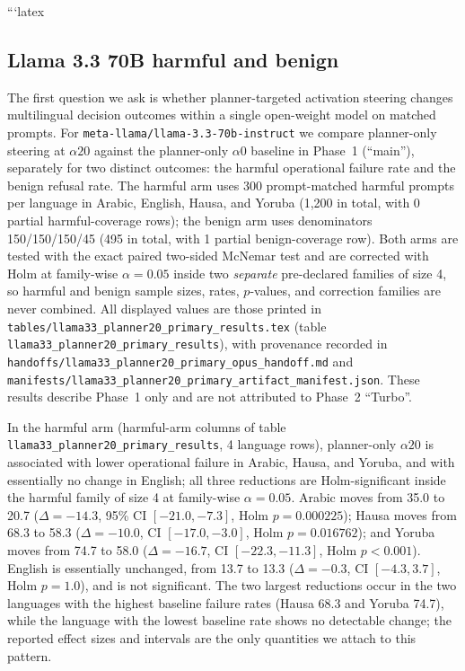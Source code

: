 ```latex
\subsection{Llama 3.3 70B harmful and benign}

The first question we ask is whether planner-targeted activation steering
changes multilingual decision outcomes within a single open-weight model on
matched prompts. For \texttt{meta-llama/llama-3.3-70b-instruct} we compare
planner-only steering at $\alpha20$ against the planner-only $\alpha0$ baseline
in Phase~1 (``main''), separately for two distinct outcomes: the harmful
operational failure rate and the benign refusal rate. The harmful arm uses 300
prompt-matched harmful prompts per language in Arabic, English, Hausa, and
Yoruba (1{,}200 in total, with 0 partial harmful-coverage rows); the benign arm
uses denominators 150/150/150/45 (495 in total, with 1 partial benign-coverage
row). Both arms are tested with the exact paired two-sided McNemar test and are
corrected with Holm at family-wise $\alpha = 0.05$ inside two \emph{separate}
pre-declared families of size 4, so harmful and benign sample sizes, rates,
$p$-values, and correction families are never combined. All displayed values are
those printed in \texttt{tables/llama33\_planner20\_primary\_results.tex}
(table \texttt{llama33\_planner20\_primary\_results}), with provenance recorded
in \texttt{handoffs/llama33\_planner20\_primary\_opus\_handoff.md} and
\texttt{manifests/llama33\_planner20\_primary\_artifact\_manifest.json}. These
results describe Phase~1 only and are not attributed to Phase~2 ``Turbo''.

In the harmful arm (harmful-arm columns of table
\texttt{llama33\_planner20\_primary\_results}, 4 language rows), planner-only
$\alpha20$ is associated with lower operational failure in Arabic, Hausa, and
Yoruba, and with essentially no change in English; all three reductions are
Holm-significant inside the harmful family of size 4 at family-wise
$\alpha = 0.05$. Arabic moves from 35.0 to 20.7 ($\Delta = -14.3$, 95\% CI
$[-21.0, -7.3]$, Holm $p = 0.000225$); Hausa moves from 68.3 to 58.3
($\Delta = -10.0$, CI $[-17.0, -3.0]$, Holm $p = 0.016762$); and Yoruba moves
from 74.7 to 58.0 ($\Delta = -16.7$, CI $[-22.3, -11.3]$, Holm $p < 0.001$).
English is essentially unchanged, from 13.7 to 13.3 ($\Delta = -0.3$, CI
$[-4.3, 3.7]$, Holm $p = 1.0$), and is not significant. The two largest
reductions occur in the two languages with the highest baseline failure rates
(Hausa 68.3 and Yoruba 74.7), while the language with the lowest baseline rate
shows no detectable change; the reported effect sizes and intervals are the only
quantities we attach to this pattern.

